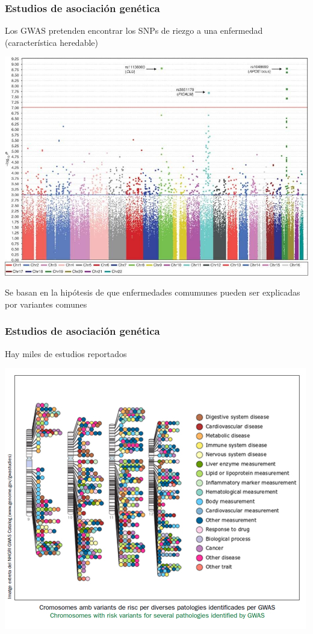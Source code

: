 \documentclass{beamer}\usepackage[]{graphicx}\usepackage[]{color}
\begin{document}
\begin{frame}[fragile]
\frametitle{Estudios de asociaci\'on gen\'etica}

Los GWAS pretenden encontrar los SNPs de riezgo a una enfermedad (caracter\'istica heredable)

\begin{center}
\includegraphics[width=0.5\linewidth]{alz.jpg}
\end{center}

Se basan en la hip\'otesis de que enfermedades comumunes pueden ser explicadas por variantes comunes
\end{frame}


\begin{frame}[fragile]
\frametitle{Estudios de asociaci\'on gen\'etica}

Hay miles de estudios reportados
\begin{center}
\includegraphics[width=0.5\linewidth]{gwascat.jpg}
\end{center}
\end{frame}
\end{document}
